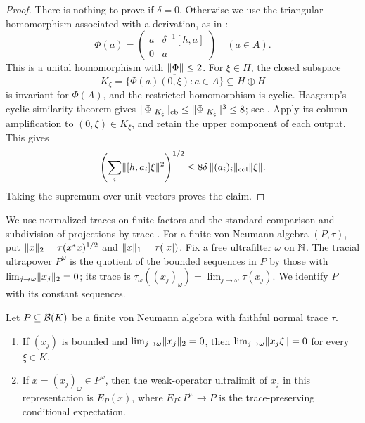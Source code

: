 \begin{proof}
There is nothing to prove if \(\delta=0\). Otherwise
we use the triangular homomorphism associated with a derivation,
as in \cite[p.~216]{Haagerup1983}:
\[
 \Phi(a)=
 \begin{pmatrix}a&\delta^{-1}[h,a]\\0&a\end{pmatrix}
 \quad(a\in A).
\]
This is a unital homomorphism with \(\lVert\Phi\rVert\le2\). For \(\xi\in H\),
the closed subspace
\[
 K_\xi=\overline{\{\Phi(a)(0,\xi):a\in A\}}
 \subseteq H\oplus H
\]
is invariant for \(\Phi(A)\), and the restricted homomorphism is cyclic.
Haagerup's cyclic similarity theorem gives
\(\lVert\Phi|_{K_\xi}\rVert_{\mathrm{cb}}\le\lVert\Phi|_{K_\xi}\rVert^3\le8\);
see \cite[Theorem~1.1 and its proof, pp.~217, 225]{Haagerup1983}.
Apply its column amplification to \((0,\xi)\in K_\xi\), and retain the
upper component of each output. This gives
\[
 \left(\sum_i\lVert[h,a_i]\xi\rVert^2\right)^{1/2}
 \le8\delta\,\lVert(a_i)_i\rVert_{\mathrm{col}}\lVert\xi\rVert.
\]
Taking the supremum over unit vectors proves the claim.
\end{proof}

We use normalized traces on finite factors and the standard comparison
and subdivision of projections by trace
\cite[III.1.7.9--10, p.~257; III.2.5.4(iii) and Theorem~III.2.5.7,
p.~279]{BlackadarOperatorAlgebras}.
For a finite von Neumann
algebra \((P,\tau)\), put
\(\lVert x\rVert_2=\tau(x^*x)^{1/2}\) and
\(\lVert x\rVert_1=\tau(|x|)\). Fix a free ultrafilter \(\omega\) on
\(\mathbb N\). The tracial ultrapower \(P^\omega\) is the quotient of the
bounded sequences in \(P\) by those with
\(\lim_{j\to\omega}\lVert x_j\rVert_2=0\); its trace is
\(\tau_\omega((x_j)_\omega)=\lim_{j\to\omega}\tau(x_j)\).
We identify \(P\) with its constant sequences.

\begin{lemma}
\label{lem:trace-transfer}
Let \(P\subseteq\mathcal B(K)\) be a finite von Neumann algebra with faithful
normal trace \(\tau\).
\begin{enumerate}[label=\textup{(\roman*)}]
\item If \((x_j)\) is bounded and
\(\lim_{j\to\omega}\lVert x_j\rVert_2=0\), then
\(\lim_{j\to\omega}\lVert x_j\xi\rVert=0\) for every \(\xi\in K\).
\item If \(x=(x_j)_\omega\in P^\omega\), then the weak-operator
ultralimit of \(x_j\) in this representation is \(E_P(x)\), where
\(E_P:P^\omega\to P\) is the trace-preserving conditional expectation.
\end{enumerate}
\end{lemma}

